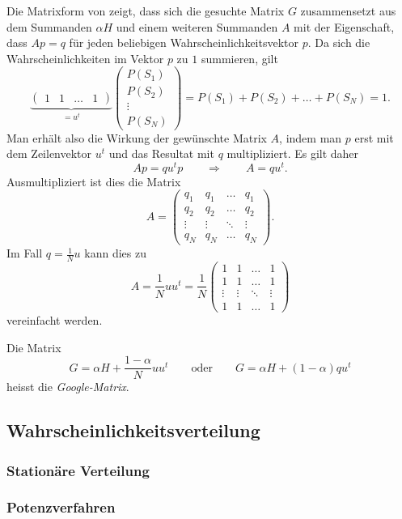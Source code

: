Die Matrixform von
\label{buch:google:eqn:composed}
zeigt, dass sich die gesuchte Matrix $G$ zusammensetzt aus dem Summanden
$\alpha H$ und einem weiteren Summanden $A$ mit der Eigenschaft, dass
$Ap = q$ für jeden beliebigen Wahrscheinlichkeitsvektor $p$.
Da sich die Wahrscheinlichkeiten im Vektor $p$ zu $1$ summieren, gilt
\[
\underbrace{
\begin{pmatrix}
1&1&\dots&1
\end{pmatrix}
}_{\displaystyle = u^t}
\begin{pmatrix}
P(S_1)\\
P(S_2)\\
\vdots\\
P(S_N)
\end{pmatrix}
=
P(S_1)+P(S_2)+\dots+P(S_N)=1.
\]
Man erhält also die Wirkung der gewünschte Matrix $A$, indem man $p$
erst mit dem Zeilenvektor $u^t$ und das Resultat mit $q$ multipliziert.
Es gilt daher
\[
Ap = qu^tp
\qquad\Rightarrow\qquad
A=qu^t.
\]
Ausmultipliziert ist dies die Matrix
\[
A=\begin{pmatrix}
q_1&q_1&\dots&q_1\\
q_2&q_2&\dots&q_2\\
\vdots&\vdots&\ddots&\vdots\\
q_N&q_N&\dots&q_N
\end{pmatrix}.
\]
Im Fall $q=\frac1Nu$ kann dies zu
\[
A
=
\frac1N uu^t
=
\frac1N
\begin{pmatrix}
1&1&\dots&1\\
1&1&\dots&1\\
\vdots&\vdots&\ddots&\vdots\\
1&1&\dots&1
\end{pmatrix}
\]
vereinfacht werden.

\begin{definition}
Die Matrix
\[
G
=
\alpha H
+
\frac{1-\alpha}{N}
uu^t
\qquad\text{oder}\qquad
G
=
\alpha H
+
(1-\alpha)qu^t
\]
heisst die
{\em Google-Matrix}.
%
\end{definition}


%
%
\subsection{Wahrscheinlichkeitsverteilung
\label{buch:subsection:wahrscheinlichkeitsverteilung}}
\subsubsection{Stationäre Verteilung}
\subsubsection{Potenzverfahren}

